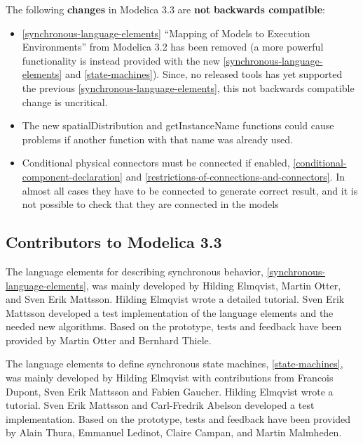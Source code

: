 \documentclass[10pt,a4paper]{report}
\def\doublelabel#1{\label{#1}\hypertarget{#1}{}}
\begin{document}
The following \textbf{changes} in Modelica 3.3 are \textbf{not}
\textbf{backwards compatible}:

\begin{itemize}
\item
  \ref{synchronous-language-elements} ``Mapping of Models to Execution Environments'' from
  Modelica 3.2 has been removed (a more powerful functionality is
  instead provided with the new \ref{synchronous-language-elements} and \ref{state-machines}). Since, no
  released tools has yet supported the previous \ref{synchronous-language-elements}, this not
  backwards compatible change is uncritical.
\item
  The new spatialDistribution and getInstanceName functions could cause
  problems if another function with that name was already used.
\end{itemize}

\begin{itemize}
\item
  Conditional physical connectors must be connected if enabled, 
  \ref{conditional-component-declaration} 
  and \ref{restrictions-of-connections-and-connectors}. In almost all cases they have to be connected
  to generate correct result, and it is not possible to check that they
  are connected in the models
\end{itemize}

\subsection{Contributors to Modelica 3.3}\doublelabel{contributors-to-modelica-3-3}

The language elements for describing synchronous behavior, \ref{synchronous-language-elements},
was mainly developed by Hilding Elmqvist, Martin Otter, and Sven Erik
Mattsson. Hilding Elmqvist wrote a detailed tutorial. Sven Erik Mattsson
developed a test implementation of the language elements and the needed
new algorithms. Based on the prototype, tests and feedback have been
provided by Martin Otter and Bernhard Thiele.

The language elements to define synchronous state machines, \ref{state-machines},
was mainly developed by Hilding Elmqvist with contributions from
Francois Dupont, Sven Erik Mattsson and Fabien Gaucher. Hilding Elmqvist
wrote a tutorial. Sven Erik Mattsson and Carl-Fredrik Abelson developed
a test implementation. Based on the prototype, tests and feedback have
been provided by Alain Thura, Emmanuel Ledinot, Claire Campan, and
Martin Malmheden.
\end{document}
